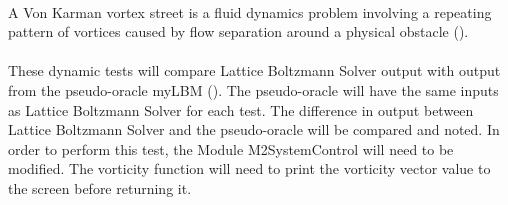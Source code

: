 \documentclass[12pt, titlepage]{article}
\newcommand{\famname}{Lattice Boltzmann Solver}
\begin{document}
\paragraph{} 
A Von Karman vortex street is a fluid dynamics problem involving a repeating pattern of vortices caused by flow separation around a physical obstacle (\citet{vonkarman}).
\paragraph{}
These dynamic tests will compare {\famname} output with output from
the pseudo-oracle myLBM (\citet{pylbmcode}). The pseudo-oracle will have the
same inputs as {\famname} for each test. The difference in output between {\famname} and the pseudo-oracle will be compared and noted. In order to perform this test, the Module M2SystemControl will need to be modified. The vorticity function will need to print the vorticity vector value to the screen before returning it. %
\end{document}
